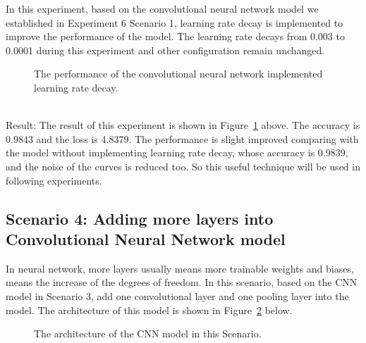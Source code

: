 \documentclass[]{UCD_CS_FYP_Report}
\begin{document}
In this experiment, based on the convolutional neural network model we established in Experiment 6 Scenario 1, learning rate decay is implemented to improve the performance of the model. The learning rate decays from 0.003 to 0.0001 during this experiment and other configuration remain unchanged.
\begin{figure}[h]
\centering
\fboxsep 2mm
\caption{\label{fig:MNIST_CNN_S3E1} The performance of the convolutional neural network implemented learning rate decay.}
\end{figure}
\\Result: The result of this experiment is shown in Figure~\ref{fig:MNIST_CNN_S3E1} above. The accuracy is 0.9843 and the loss is 4.8379. The performance is slight improved comparing with the model without implementing learning rate decay, whose accuracy is 0.9839, and the noise of the curves is reduced too. So this useful technique will be used in following experiments.
%
\subsection{Scenario 4: Adding more layers into Convolutional Neural Network model}
In neural network, more layers usually means more trainable weights and biases, means the increase of the degrees of freedom. In this scenario, based on the CNN model in Scenario 3, add one convolutional layer and one pooling layer into the model. The architecture of this model is shown in Figure~\ref{fig:MNIST_CNN_S4_Architecture} below.
\begin{figure}[h]
\centering
\fboxsep 2mm
\caption{\label{fig:MNIST_CNN_S4_Architecture} The architecture of the CNN model in this Scenario.}
\end{figure}
\end{document}
